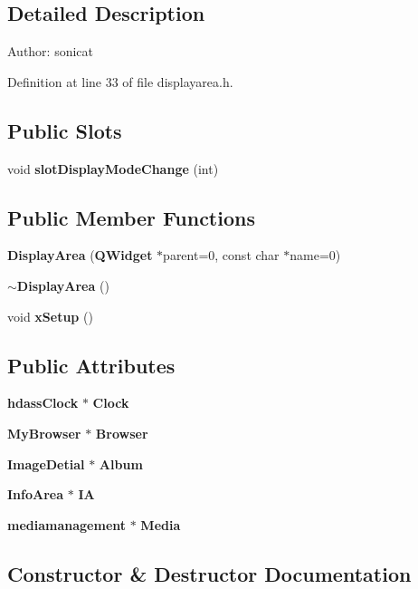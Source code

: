 \subsection{Detailed Description}
\begin{Desc}
\item[Author:]sonicat \end{Desc}




Definition at line 33 of file displayarea.h.\subsection*{Public Slots}
\begin{CompactItemize}
\item 
void {\bf slot\-Display\-Mode\-Change} (int)
\end{CompactItemize}
\subsection*{Public Member Functions}
\begin{CompactItemize}
\item 
{\bf Display\-Area} ({\bf QWidget} $\ast$parent=0, const char $\ast$name=0)
\item 
{\bf $\sim$Display\-Area} ()
\item 
void {\bf x\-Setup} ()
\end{CompactItemize}
\subsection*{Public Attributes}
\begin{CompactItemize}
\item 
{\bf hdass\-Clock} $\ast$ {\bf Clock}
\item 
{\bf My\-Browser} $\ast$ {\bf Browser}
\item 
{\bf Image\-Detial} $\ast$ {\bf Album}
\item 
{\bf Info\-Area} $\ast$ {\bf IA}
\item 
{\bf mediamanagement} $\ast$ {\bf Media}
\end{CompactItemize}


\subsection{Constructor \& Destructor Documentation}
